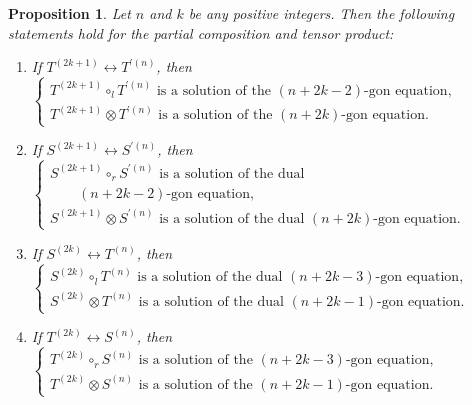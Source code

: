 \documentclass[pdftex]{sigma}
\numberwithin{equation}{section}
\newtheorem{Proposition}[Theorem]{Proposition}
\theoremstyle{definition}
\begin{document}
\begin{Proposition}\label{prop:commpolygon}
 Let $n$ and $k$ be any positive integers.
 Then the following statements hold for the partial composition and tensor product:
 \begin{enumerate}\itemsep=0pt
 \item[$(1)$] If $T^{(2k+1)}\leftrightarrow T^{\prime(n)}$, then
 $
 \begin{cases}
 \text{$T^{(2k+1)}\circ_l T^{\prime(n)}$ is a solution of the $(n+2k-2)$-gon equation,}\\
 \text{$T^{(2k+1)}\otimes T^{\prime(n)}$ is a solution of the $(n+2k)$-gon equation.}
 \end{cases} $\!\!
 \item[$(2)$] If $S^{(2k+1)}\leftrightarrow S^{\prime(n)}$, then
 $
 \begin{cases}
 \text{$S^{(2k+1)}\circ_r S^{\prime(n)}$ is a solution of the dual}\\[-1mm]
 \qquad \text{$(n+2k-2)$-gon equation,}\\
 \text{$S^{(2k+1)}\otimes S^{\prime(n)}$ is a solution of the dual $(n+2k)$-gon equation.}
 \end{cases} $\!\!\!\!
 \item[$(3)$] If $S^{(2k)}\leftrightarrow T^{(n)}$, then
 $
 \begin{cases}
 \text{$S^{(2k)}\circ_lT^{(n)}$ is a solution of the dual $(n+2k-3)$-gon equation,}\\
 \text{$S^{(2k)}\otimes T^{(n)}$ is a solution of the dual $(n+2k-1)$-gon equation.}
 \end{cases}
 $
 \item[$(4)$] If $T^{(2k)}\leftrightarrow S^{(n)}$, then
 $
 \begin{cases}
 \text{$T^{(2k)}\circ_rS^{(n)}$ is a solution of the $(n+2k-3)$-gon equation,}\\
 \text{$T^{(2k)}
 \otimes S^{(n)}$ is a solution of the $(n+2k-1)$-gon equation.}
 \end{cases}
 $
\end{enumerate}
\end{Proposition}
\end{document}
